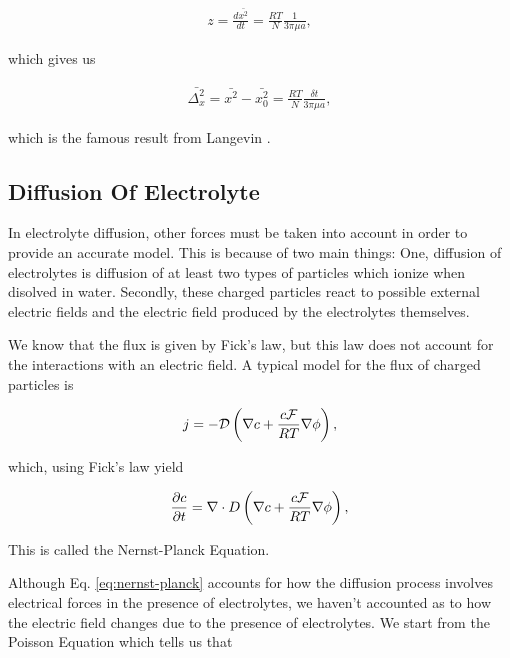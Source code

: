 \begin{align}
	z = \frac{d \bar{x^2}}{dt} =  \frac{RT}{N}\frac{1}{3\pi\mu a},
\end{align}

which gives us

\begin{align}
	\bar{\Delta_x^2} = \bar{x^2} - \bar{x_0^2} =  \frac{RT}{N}\frac{\delta t}{3\pi\mu a},
\end{align}

which is the famous result from Langevin \cite{langevin_original}.











\subsection{Diffusion Of Electrolyte}

In electrolyte diffusion, other forces must be taken into account in order to provide an accurate model. This is because of two main things: One, diffusion of electrolytes is diffusion of at least two types of particles which ionize when disolved in water. Secondly, these charged particles react to possible external electric fields and the electric field produced by the electrolytes themselves.

We know that the flux is given by Fick's law, but this law does not account for the interactions with an electric field. A typical model for the flux of charged particles is

\begin{align}
	j= -\mathcal{D}\left({\nabla c + \frac{c \mathcal{F}}{RT}\nabla \phi}\right),
\end{align}

which, using Fick's law yield


\begin{align}
\label{eq:nernst-planck}
	\frac{\partial c}{\partial t}= \nabla \cdot D\left({\nabla c + \frac{c \mathcal{F}}{RT}\nabla \phi}\right),
\end{align}


This is called the Nernst-Planck Equation.

Although Eq. \ref{eq:nernst-planck} accounts for how the diffusion process involves electrical forces in the presence of electrolytes, we haven't accounted as to how the electric field changes due to the presence of electrolytes. 
We start from the Poisson Equation which tells us that

